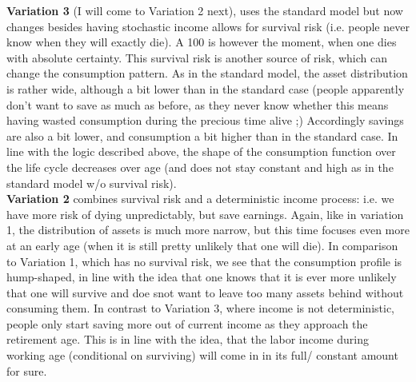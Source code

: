 \documentclass[12pt,a4paper]{article}
\begin{document}
\textbf{Variation 3} (I will come to Variation 2 next), uses the standard model but now changes besides having stochastic income allows for survival risk (i.e. people never know when they will exactly die). A 100 is however the moment, when one dies with absolute certainty. This survival risk is another source of risk, which can change the consumption pattern. As in the standard model, the asset distribution is rather wide, although a bit lower than in the standard case (people apparently don't want to save as much as before, as they never know whether this means having wasted consumption during the precious time alive ;) Accordingly savings are also a bit lower, and consumption a bit higher than in the standard case. In line with the logic described above, the shape of the consumption function over the life cycle decreases over age (and does not stay constant and high as in the standard model w/o survival risk). \\

\textbf{Variation 2} combines survival risk and a deterministic income process: i.e. we have more risk of dying unpredictably, but save earnings. Again, like in variation 1, the distribution of assets is much more narrow, but this time focuses even more at an early age (when it is still pretty unlikely that one will die).  In comparison to Variation 1, which has no survival risk, we see that the consumption profile is hump-shaped, in line with the idea that one knows that it is ever more unlikely that one will survive and doe snot want to leave too many assets behind without consuming them. In contrast to Variation 3, where income is not deterministic, people only start saving more out of current income as they approach the retirement age. This is in line with the idea, that the labor income during working age (conditional on surviving) will come in in its full/ constant amount for sure.
\end{document}
